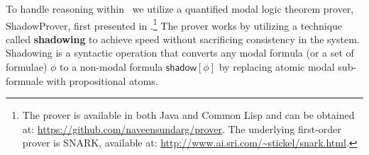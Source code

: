 
To handle reasoning within \CEC\, we utilize a quantified modal logic
theorem prover, \textsf{ShadowProver}, first presented in
\cite{nsg_sb_dde_ijcai,uncertaintyized_cognitive_calculus}.\footnote{The
  prover is available in both Java and Common Lisp and can be obtained
  at: \url{https://github.com/naveensundarg/prover}. The underlying
  first-order prover is SNARK, available at:
  \url{http://www.ai.sri.com/~stickel/snark.html}.}  The prover works
by utilizing a technique called \textbf{shadowing} to achieve speed
without sacrificing consistency in the system.  Shadowing is a
syntactic operation that converts any modal formula (or a set of
formulae) $\phi$ to a non-modal formula $\mathsf{shadow}[\phi]$ by replacing atomic
modal sub-formuale with propositional atoms.


